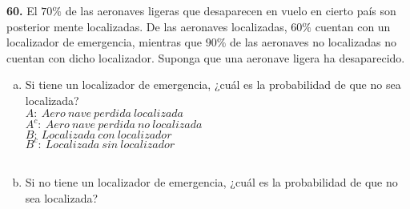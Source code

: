 \documentclass[12pt, letterpaper, spanish]{article}
\begin{document}
\textbf{60.} El $70\%$ de las aeronaves ligeras que desaparecen en vuelo en cierto país son posterior mente localizadas. De las aeronaves localizadas, $60\%$ cuentan con un localizador de emergencia, mientras que $90\%$ de las aeronaves no localizadas no cuentan con dicho localizador. Suponga que una aeronave ligera ha desaparecido.

\begin{enumerate}[a)]
	\item Si tiene un localizador de emergencia, ¿cuál es la probabilidad de que no sea localizada?\\
	$A:\ Aero\ nave\ perdida\ localizada$\\
	$A^c:\ Aero\ nave\ perdida\ no\ localizada$\\
	$B:\ Localizada\ con\ localizador$\\
	$B^c:\ Localizada\ sin\ localizador$\\\\
	\item Si no tiene un localizador de emergencia, ¿cuál es la probabilidad de que no sea localizada?
\end{enumerate}\vskip0.5cm
\end{document}

